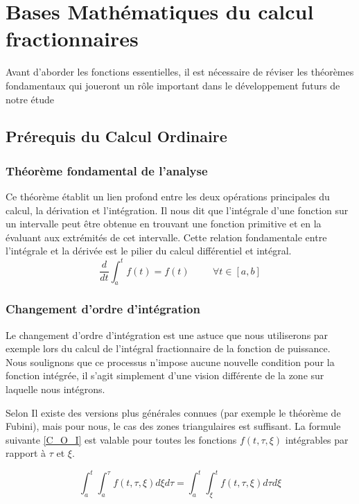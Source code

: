\chapter{Bases Mathématiques du calcul fractionnaires}
\label{chap:Préliminaires}
\pagestyle{fancy}
Avant d'aborder les fonctions essentielles, il est nécessaire de réviser les théorèmes fondamentaux qui joueront un rôle important dans le développement futurs de notre étude
\section{Prérequis du Calcul Ordinaire}
\subsection*{Théorème fondamental de l'analyse}
Ce théorème établit un lien profond entre les deux opérations principales du calcul, la dérivation et l'intégration. Il nous dit que l'intégrale d'une fonction sur un intervalle peut être obtenue en trouvant une fonction primitive et en la évaluant aux extrémités de cet intervalle. Cette relation fondamentale entre l'intégrale et la dérivée est le pilier du calcul différentiel et intégral.
    \begin{equation}\label{FTC}
        \frac{d}{dt}\int_a^t f(t) = f(t) \hspace{1cm} \forall t\in[a,b]
    \end{equation}
\subsection*{Changement d'ordre d'intégration}
Le changement d'ordre d'intégration est une astuce que nous utiliserons par exemple lors du calcul de l'intégral fractionnaire de la fonction de puissance. Nous soulignons que ce processus n'impose aucune nouvelle condition pour la fonction intégrée, il s'agit simplement d'une vision différente de la zone sur laquelle nous intégrons.

Selon \cite{FDE&applications} Il existe des versions plus générales connues (par exemple le théorème de Fubini), mais pour nous, le cas des zones triangulaires est suffisant. La formule suivante \ref{C_O_I} est valable pour toutes les fonctions $f (t, \tau, \xi)$ intégrables par rapport à $\tau$ et $\xi$.

\begin{equation}\label{C_O_I}
    \int_{a}^{t} \int_{a}^{\tau} f(t, \tau, \xi) d\xi d\tau = \int_{a}^{t} \int_{\xi}^{t} f(t, \tau, \xi) d\tau d\xi
\end{equation}

